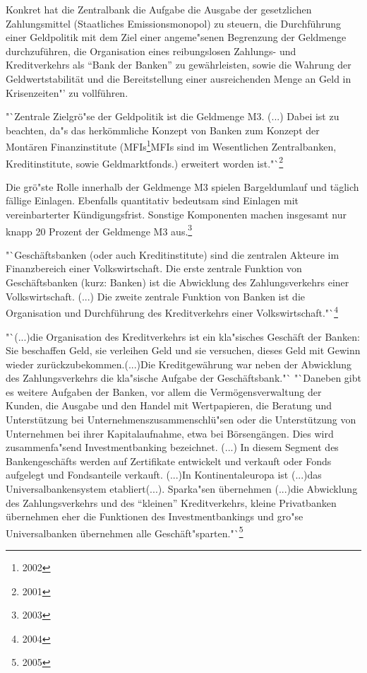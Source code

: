 \documentclass[
        onecolumn,
        a4paper,
        abstracton,
        parskip=half
        ,final
        ]{scrartcl}
\begin{document}
Konkret hat die Zentralbank die Aufgabe
die Ausgabe der gesetzlichen Zahlungsmittel (Staatliches Emissionsmonopol) zu steuern, die Durchf{\"u}hrung einer Geldpolitik mit dem Ziel einer angeme{"s}enen Begrenzung der Geldmenge durchzuf{\"u}hren, die Organisation eines reibungslosen Zahlungs- und Kreditverkehrs als "`Bank der Banken"' zu gew{\"a}hrleisten, sowie die Wahrung der Geldwertstabilit{\"a}t und die Bereitstellung einer ausreichenden Menge an Geld in Krisenzeiten"' zu vollf{\"u}hren.

"`Zentrale Zielgr{\"o}{"s}e der Geldpolitik ist die Geldmenge M3. (...) Dabei ist zu beachten, da{"s} das herk{\"o}mmliche Konzept von Banken zum Konzept der Mont{\"a}ren Finanzinstitute (\ac{MFIs}\footnote{2002}{MFIs sind im Wesentlichen Zentralbanken, Kreditinstitute, sowie Geldmarktfonds.\citep*[vgl.][S.508]{Basseler2010}}) erweitert worden ist."`\footnote{2001}{\citep*[vgl.][S. 507]{Basseler2010}}

Die gr{\"o}{"s}te Rolle innerhalb der Geldmenge M3 spielen Bargeldumlauf und t{\"a}glich f{\"a}llige Einlagen. Ebenfalls quantitativ bedeutsam sind Einlagen mit vereinbarterter K{\"u}ndigungsfrist.
Sonstige Komponenten machen insgesamt nur knapp 20 Prozent der Geldmenge M3 aus.\footnote{2003}{\citep*[vgl.][S.508]{Basseler2010}}

"`Gesch{\"a}ftsbanken (oder auch Kreditinstitute) sind die zentralen Akteure im Finanzbereich einer Volkswirtschaft. Die erste zentrale Funktion von Gesch{\"a}ftsbanken (kurz: Banken) ist die Abwicklung des Zahlungsverkehrs einer Volkswirtschaft. (...) Die zweite zentrale Funktion von Banken ist die Organisation und Durchf{\"u}hrung des Kreditverkehrs einer Volkswirtschaft."`\footnote{2004}{\citep*[vgl.][S.512-13]{Basseler2010}}

"`(...)die Organisation des Kreditverkehrs ist ein kla{"s}isches Gesch{\"a}ft der Banken: Sie beschaffen Geld, sie verleihen Geld und sie versuchen, dieses Geld mit Gewinn wieder zur{\"u}ckzubekommen.(...)Die Kreditgew{\"a}hrung war neben der Abwicklung des Zahlungsverkehrs die kla{"s}ische Aufgabe der Gesch{\"a}ftsbank."`
 "`Daneben gibt es weitere Aufgaben der Banken, vor allem die Verm{\"o}gensverwaltung der Kunden, die Ausgabe und den Handel mit Wertpapieren, die Beratung und Unterst{\"u}tzung bei Unternehmenszusammenschl{\"u}{"s}en oder die Unterst{\"u}tzung von Unternehmen bei ihrer Kapitalaufnahme, etwa bei B{\"o}rseng{\"a}ngen. Dies wird zusammenfa{"s}end Investmentbanking bezeichnet. (...) In diesem Segment des Bankengesch{\"a}fts  werden auf Zertifikate entwickelt und verkauft oder Fonds aufgelegt und Fondsanteile verkauft. (...)In Kontinentaleuropa ist (...)das Universalbankensystem etabliert(...). Sparka{"s}en {\"u}bernehmen (...)die Abwicklung des Zahlungsverkehrs und des "`kleinen"' Kreditverkehrs, kleine Privatbanken {\"u}bernehmen eher die Funktionen des Investmentbankings und gro{"s}e Universalbanken {\"u}bernehmen alle Gesch{\"a}ft{"s}parten."`\footnote{2005}{\citep*[vgl.][S.512-13]{Basseler2010}}
\end{document}
